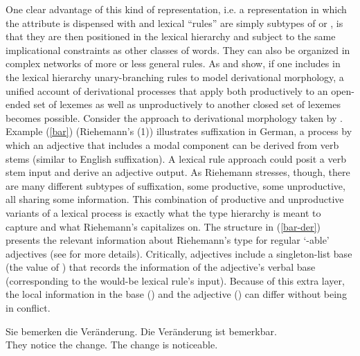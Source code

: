 \documentclass[output=paper]{langsci/langscibook}
\begin{document}
One clear advantage of this kind of representation, i.e. a representation in which the attribute  is dispensed with and lexical ``rules'' are simply subtypes of  or , is that they are then positioned in the lexical hierarchy and subject to the same implicational constraints as other classes of words. 
They can also be organized in complex networks of more or less general rules. 
As \citet{Riehemann1998} and \citet{Koenig1999c} show, if one includes in the lexical hierarchy unary-branching rules to model derivational morphology, a unified account of derivational processes that apply both productively to an open-ended set of lexemes as well as unproductively to another closed set of lexemes becomes possible. 
Consider the approach to derivational morphology taken by \citet{Riehemann1998}. 
Example (\ref{bar}) (Riehemann's (1)) illustrates  suffixation   in German, a process by which an adjective that includes a modal component can be derived from verb stems (similar to English  suffixation). 
A lexical rule approach could posit a verb stem input and derive an adjective output. 
As Riehemann stresses, though, there are many different subtypes of  suffixation, some productive, some unproductive, all sharing some information. 
This combination of productive and unproductive variants of a lexical process is exactly what the type hierarchy is meant to capture and what Riehemann's  capitalizes on. 
The structure in (\ref{bar-der}) presents the relevant information about Riehemann's type for regular  `-able' adjectives (see \citet[68]{Riehemann1998} for more details). 
Critically,  adjectives include a singleton-list base (the value of ) that records the information of the adjective's verbal base (corresponding to the would-be lexical rule's input). 
Because of this extra layer, the local information in the base () and the  adjective () can differ without being in conflict.

\begin{exe}
	\ex\label{bar}
	\gll Sie bemerken die Ver\"anderung. Die Ver\"anderung ist bemerkbar. \\
	They notice the change. The change is noticeable. \\
\end{exe}    
\end{document}
